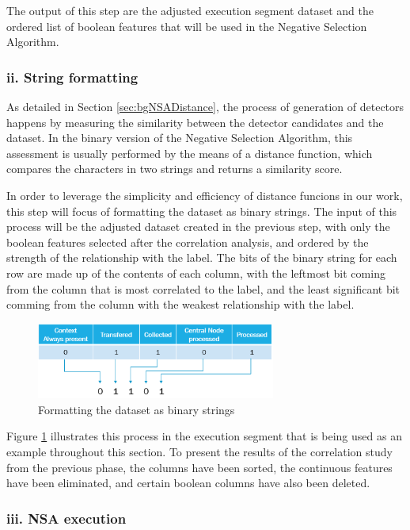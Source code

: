 The output of this step are the adjusted execution segment dataset and the ordered list of boolean features that will be used in the Negative Selection Algorithm. 

\subsubsection{ii. String formatting}

As detailed in Section \ref{sec:bgNSADistance}, the process of generation of detectors happens by measuring the similarity between the detector candidates and the dataset. In the binary version of the Negative Selection Algorithm, this assessment is usually performed by the means of a distance function, which compares the characters in two strings and returns a similarity score. 

In order to leverage the simplicity and efficiency of distance funcions in our work, this step will focus of formatting the dataset as binary strings. The input of this process will be the adjusted dataset created in the previous step, with only the boolean features selected after the correlation analysis, and ordered by the strength of the relationship with the label. The bits of the binary string for each row are made up of the contents of each column, with the leftmost bit coming from the column that is most correlated to the label, and the least significant bit comming from the column with the weakest relationship with the label.

\begin{figure}[!h]
	\centering
	\includegraphics[width=0.7\textwidth, keepaspectratio]{img/stringFormatting.png}
	\caption{Formatting the dataset as binary strings}
	\label{fig:stringFormatting}
\end{figure}

Figure \ref{fig:stringFormatting} illustrates this process in the execution segment that is being used as an example throughout this section. To present the results of the correlation study from the previous phase, the columns have been sorted, the continuous features have been eliminated, and certain boolean columns have also been deleted.

\subsubsection{iii. NSA execution}

